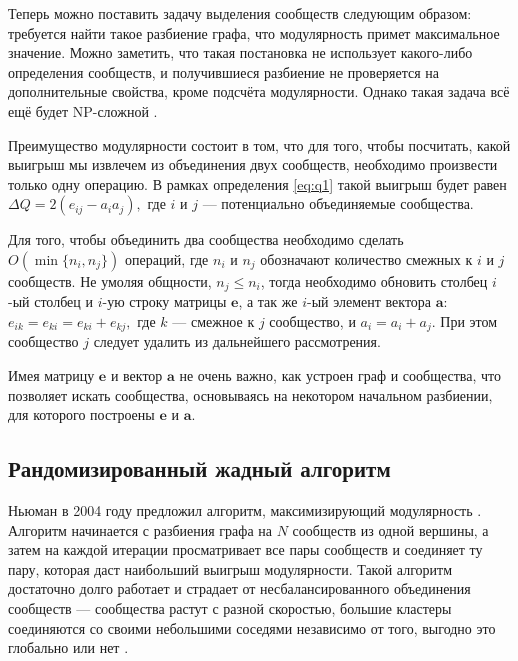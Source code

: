 Теперь можно поставить задачу выделения сообществ следующим образом: требуется найти такое разбиение графа, что модулярность примет максимальное значение. Можно заметить, что такая постановка не использует какого-либо определения сообществ, и получившиеся разбиение не проверяется на дополнительные свойства, кроме подсчёта модулярности. Однако такая задача всё ещё будет NP-сложной \cite{Brandes&al:2008}.

Преимущество модулярности состоит в том, что для того, чтобы посчитать, какой выигрыш мы извлечем из объединения двух сообществ, необходимо произвести только одну операцию. В рамках определения \eqref{eq:q1} такой выигрыш будет равен $\Delta Q = 2(e_{ij} - a_i a_j),$ где $i$ и $j$ --- потенциально объединяемые сообщества.

Для того, чтобы объединить два сообщества необходимо сделать $O(\min\{n_i, n_j\})$ операций, где $n_i$ и $n_j$ обозначают количество смежных к $i$ и $j$ сообществ. Не умоляя общности, $n_j \leq n_i$, тогда необходимо обновить столбец $i$-ый столбец и $i$-ую строку матрицы $\mathbf{e}$, а так же $i$-ый элемент вектора $\mathbf{a}$: $e_{ik} = e_{ki} = e_{ki} + e_{kj},$ где $k$ --- смежное к $j$ сообщество, и $a_{i} = a_{i} + a_{j}$. При этом сообщество $j$ следует удалить из дальнейшего рассмотрения.

Имея матрицу $\mathbf{e}$ и вектор $\mathbf{a}$ не очень важно, как устроен граф и сообщества, что позволяет искать сообщества, основываясь на некотором начальном разбиении, для которого построены $\mathbf{e}$ и $\mathbf{a}$.



\subsection{Рандомизированный жадный алгоритм}

Ньюман в 2004 году предложил алгоритм, максимизирующий модулярность \cite{Newman:2004}. Алгоритм начинается с разбиения графа на $N$ сообществ из одной вершины, а затем на каждой итерации просматривает все пары сообществ и соединяет ту пару, которая даст наибольший выигрыш модулярности. Такой алгоритм достаточно долго работает и страдает от несбалансированного объединения сообществ --- сообщества растут с разной скоростью, большие кластеры соединяются со своими небольшими соседями независимо от того, выгодно это глобально или нет \cite{Ovelgoenne&Geyer-Schulz:2012a}.

